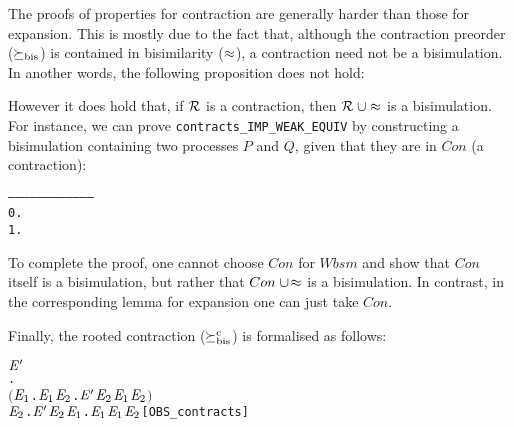 The proofs of properties for contraction are
generally harder than those for expansion. This is mostly due to the fact
  that, although the contraction preorder ($\mathrel{\succeq_{\rm{bis}}}$) is contained in
  bisimilarity ($\approx$), a contraction need not be a bisimulation.
  In another words, the following proposition does not hold:
\begin{alltt}
\end{alltt}
However it does hold that, if ${\cal R}$ is a contraction, then
 ${\cal R}\;\cup \approx$ is a bisimulation.
For instance, we can prove \texttt{contracts_IMP_WEAK_EQUIV}
 by constructing a bisimulation  containing two processes
$P$ and $Q$, given that they are in $Con$ (a contraction):
\begin{alltt}
   ------------------------------------
    0.  
    1.  
\end{alltt}
To complete the proof, one cannot choose $Con$ for $Wbsm$ and
show that $Con$ itself is a bisimulation, but rather
that $Con\;\cup\!\approx$ is a bisimulation.
In contrast, in the corresponding lemma for expansion 
one can just take $Con$.

Finally, the rooted contraction ($\mathrel{\succeq^{\rm{c}}_{\rm{bis}}}$) is formalised as follows:
\begin{alltt}
    \HOLSymConst{\HOLTokenObsContracts} \ensuremath{\HOLFreeVar{E}\sp{\prime}} \HOLTokenDefEquality{}
     \HOLSymConst{\HOLTokenForall{}}.
         \ensuremath{(}\HOLSymConst{\HOLTokenForall{}}\ensuremath{\HOLBoundVar{E}\sb{\mathrm{1}}}.  \HOLTokenTransBegin{}\HOLTokenTransEnd \ensuremath{\HOLBoundVar{E}\sb{\mathrm{1}}} \HOLSymConst{\HOLTokenImp{}} \HOLSymConst{\HOLTokenExists{}}\ensuremath{\HOLBoundVar{E}\sb{\mathrm{2}}}. \ensuremath{\HOLFreeVar{E}\sp{\prime}} \HOLTokenTransBegin{}\HOLTokenTransEnd \ensuremath{\HOLBoundVar{E}\sb{\mathrm{2}}} \HOLSymConst{\HOLTokenConj{}} \ensuremath{\HOLBoundVar{E}\sb{\mathrm{1}}} \HOLSymConst{\HOLTokenContracts{}} \ensuremath{\HOLBoundVar{E}\sb{\mathrm{2}}}\ensuremath{)} \HOLSymConst{\HOLTokenConj{}}
         \HOLSymConst{\HOLTokenForall{}}\ensuremath{\HOLBoundVar{E}\sb{\mathrm{2}}}. \ensuremath{\HOLFreeVar{E}\sp{\prime}} \HOLTokenTransBegin{}\HOLTokenTransEnd \ensuremath{\HOLBoundVar{E}\sb{\mathrm{2}}} \HOLSymConst{\HOLTokenImp{}} \HOLSymConst{\HOLTokenExists{}}\ensuremath{\HOLBoundVar{E}\sb{\mathrm{1}}}.  \HOLTokenWeakTransBegin{}\HOLTokenWeakTransEnd \ensuremath{\HOLBoundVar{E}\sb{\mathrm{1}}} \HOLSymConst{\HOLTokenConj{}} \ensuremath{\HOLBoundVar{E}\sb{\mathrm{1}}} \HOLSymConst{\HOLTokenWeakEQ} \ensuremath{\HOLBoundVar{E}\sb{\mathrm{2}}}\hfill{[OBS_contracts]}
\end{alltt}

